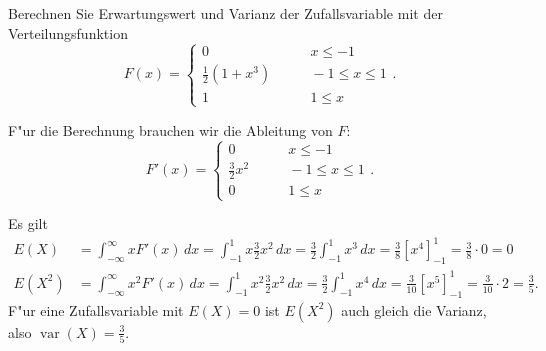 Berechnen Sie Erwartungswert und Varianz der Zufallsvariable mit der
Verteilungsfunktion
\[
F(x)=\begin{cases}
0&\qquad x\le -1\\
\frac12(1+x^3)&\qquad -1\le x\le 1\\
1&\qquad 1\le x
\end{cases}.
\]

\begin{loesung}
F"ur die Berechnung brauchen wir die Ableitung von $F$:
\[
F'(x)=\begin{cases}
0&\qquad x\le -1\\
\frac32x^2&\qquad -1\le x\le 1\\
0&\qquad 1\le x
\end{cases}.
\]

Es gilt
\begin{align*}
E(X)
&=\int_{-\infty}^{\infty}x F'(x)\,dx
=\int_{-1}^1x \frac32x^2\,dx
=\frac32\int_{-1}^1x^3\,dx
=\frac38\left[x^4\right]_{-1}^1
=\frac38\cdot 0=0\\
E(X^2)
&=\int_{-\infty}^{\infty}x^2 F'(x)\,dx
=\int_{-1}^1x^2 \frac32x^2\,dx
=\frac32\int_{-1}^1x^4\,dx=\frac3{10}\left[x^5\right]_{-1}^1
=\frac3{10}\cdot 2=\frac35.
\end{align*}
F"ur eine Zufallsvariable mit $E(X)=0$ ist $E(X^2)$ auch gleich
die Varianz, also $\operatorname{var}(X)=\frac35.$
\end{loesung}

